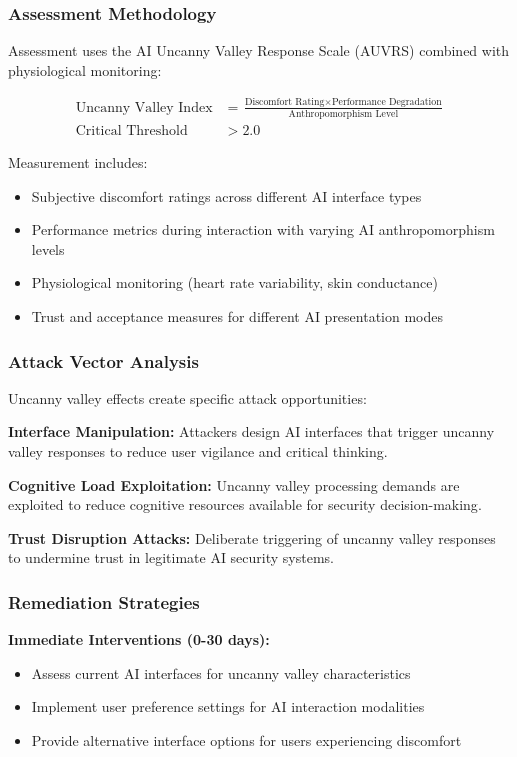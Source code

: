 \documentclass[11pt,a4paper]{article}
\begin{document}
\subsubsection{Assessment Methodology}

Assessment uses the AI Uncanny Valley Response Scale (AUVRS) combined with physiological monitoring:

\begin{align}
\text{Uncanny Valley Index} &= \frac{\text{Discomfort Rating} \times \text{Performance Degradation}}{\text{Anthropomorphism Level}} \\
\text{Critical Threshold} &> 2.0
\end{align}

Measurement includes:
\begin{itemize}
\item Subjective discomfort ratings across different AI interface types
\item Performance metrics during interaction with varying AI anthropomorphism levels
\item Physiological monitoring (heart rate variability, skin conductance)
\item Trust and acceptance measures for different AI presentation modes
\end{itemize}

\subsubsection{Attack Vector Analysis}

Uncanny valley effects create specific attack opportunities:

\textbf{Interface Manipulation:} Attackers design AI interfaces that trigger uncanny valley responses to reduce user vigilance and critical thinking\cite{interface2024}.

\textbf{Cognitive Load Exploitation:} Uncanny valley processing demands are exploited to reduce cognitive resources available for security decision-making\cite{load2023}.

\textbf{Trust Disruption Attacks:} Deliberate triggering of uncanny valley responses to undermine trust in legitimate AI security systems\cite{trust2024}.

\subsubsection{Remediation Strategies}

\textbf{Immediate Interventions (0-30 days):}
\begin{itemize}
\item Assess current AI interfaces for uncanny valley characteristics
\item Implement user preference settings for AI interaction modalities
\item Provide alternative interface options for users experiencing discomfort
\end{itemize}
\end{document}
